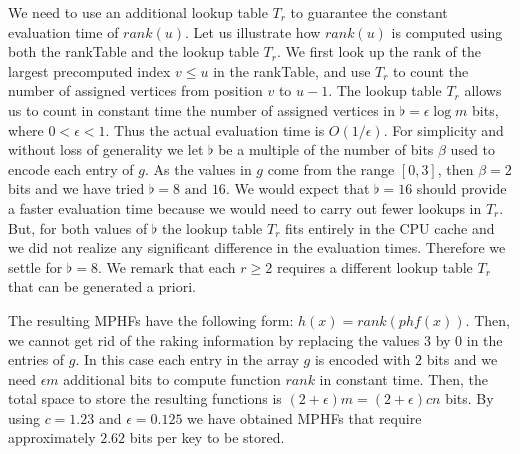 We need to use an additional lookup table $T_r$
to guarantee the constant evaluation time of $\mathit{rank}(u)$.
Let us illustrate how $\mathit{rank}(u)$ is computed
using both the rankTable and the lookup table $T_r$.
We first look up
the rank of the largest precomputed index
$v\leq u$ in the rankTable,
and use $T_r$ to count the number of assigned vertices from position
$v$ to $u-1$.
The lookup table $T_r$ allows us to count in constant time
the number of assigned vertices in $\flat=\epsilon \log m$ bits,
where $0 < \epsilon  < 1$. Thus the actual evaluation time is $O(1/\epsilon)$.
For simplicity and
without loss of generality we let $\flat$ be a multiple of the number of
bits $\beta$ used to encode each entry of $g$.
As the values in $g$ come from the range $[0,3]$,
then $\beta=2$ bits and we have tried $\flat = 8 \text{ and } 16$.
We would expect that $\flat = 16$ should provide
a faster evaluation time because we would need to carry out fewer lookups
in $T_r$. But, for both values of $\flat$ the lookup table $T_r$ fits entirely in
the CPU cache and we did not realize any significant difference in
the evaluation times. Therefore we settle for $\flat=8$.
We remark that each $r \ge 2$ requires
a different lookup table $T_r$ that can be generated a priori.








The resulting
MPHFs have the following form:
$h(x) = \mathit{rank}(\mathit{phf}(x))$.
Then, we cannot get rid of
the raking information by replacing the values 3 by 0 in the entries of $g$.
In this case each entry in the array $g$ is encoded
with $2$ bits and we need $\epsilon m$ additional bits to compute function
$\mathit{rank}$ in constant time. Then, the total space to store
the resulting functions is $(2 + \epsilon)m = (2 + \epsilon)cn$ bits.
By using $c = 1.23$ and $\epsilon = 0.125$
we have obtained MPHFs that require approximately $2.62$ bits per key to be stored.

